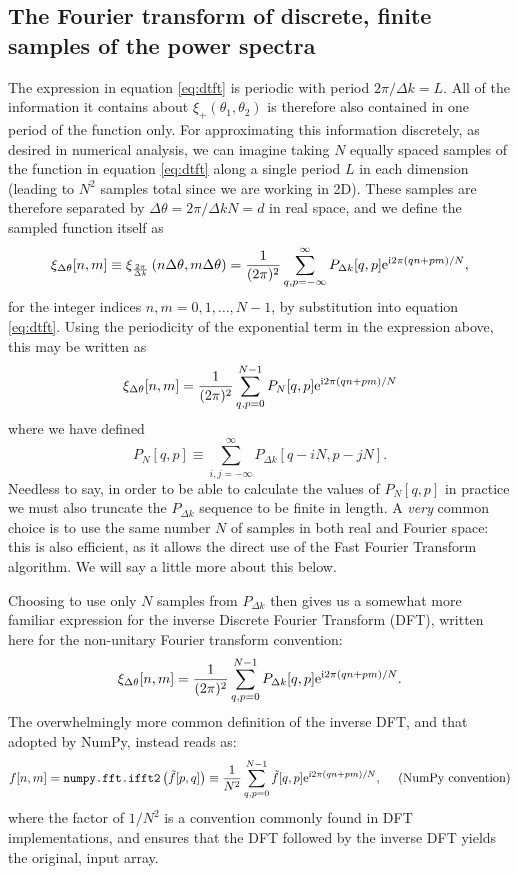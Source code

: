 \documentclass[preprint]{aastex}
\newcommand{\mi}{{\rm i}}
\newcommand{\me}{{\rm e}}
\begin{document}
\subsection{The Fourier transform of discrete, finite samples of the power spectra}
The expression in equation \eqref{eq:dtft} is periodic with period $2
\pi / \Delta k = L$.  All of the information it contains about
$\xi_+ (\theta_1, \theta_2)$ is therefore also contained in one period
of the function only.  For approximating this information discretely, as desired in
numerical analysis, we can imagine taking $N$ equally spaced samples of
the function in equation \eqref{eq:dtft} along a single period $L$ in each
dimension (leading to $N^2$ samples total since we are working in 2D).
These samples are therefore separated by $\Delta \theta = 2 \pi /
\Delta k N = d$ in real space, and we define the sampled
function itself as
\begin{equation}
\xi_{\Delta \theta}[n, m] \equiv \xi_{\frac{2 \pi}{\Delta
    k}} \left( n \Delta \theta, m \Delta \theta \right) = \frac{1}{( 2 \pi)^2}
\sum_{q,p=-\infty}^{\infty} P_{\Delta k} [q, p] \me^{\mi 2 \pi (qn +
  pm) / N},
\end{equation}
for the integer indices $n, m = 0, 1, \ldots, N-1$, by substitution into equation
\eqref{eq:dtft}.  Using the periodicity of the exponential term in the
expression above, this may be written as
\begin{equation}
\xi_{\Delta \theta}[n, m] = \frac{1}{( 2 \pi)^2}
\sum_{q,p=0}^{N-1} P_N [q, p] \me^{\mi 2 \pi (qn +
  pm) / N}
\end{equation}
where we have defined
\begin{equation}
P_N[q, p] \equiv \sum_{i,j=-\infty}^{\infty}  P_{\Delta k} [q - i N, p
- j N] .
\end{equation}
Needless to say, in order to be able to calculate the values of
$P_N[q, p]$ in practice we must also truncate the 
$P_{\Delta k}$ sequence to be finite in length.  A \emph{very} common
choice is to use the same number $N$ of samples in both real and
Fourier space: this is also efficient, as it allows the direct use of
the Fast Fourier Transform algorithm.  We will say a little more about
this below.

Choosing to use only $N$
samples from $P_{\Delta k}$ then gives us a somewhat more
familiar expression for the inverse Discrete Fourier Transform (DFT),
written here for the non-unitary Fourier transform convention:
\begin{equation}
\xi_{\Delta \theta}[n, m] = \frac{1}{( 2 \pi)^2}
\sum_{q,p=0}^{N-1} P_{\Delta k} [q, p] \me^{\mi 2 \pi (qn +
  pm) / N}. \label{eq:dft}
\end{equation}
The overwhelmingly more common definition of the inverse DFT, and that adopted by
NumPy, instead reads as:
\begin{equation}
f[n, m] = \texttt{numpy.fft.ifft2}\left(\tilde{f}[p, q]\right) \equiv \frac{1}{N^2}
\sum_{q,p=0}^{N-1} \tilde{f}[q, p] \me^{\mi 2 \pi (qn +
  pm) / N} ,~~~~ (\textrm{NumPy convention}) \label{eq:dftnumpy}
\end{equation}
where the factor of $1/N^2$ is a convention commonly found in DFT
implementations, and ensures
that the DFT followed by the inverse DFT yields the original, input array.
\end{document}
